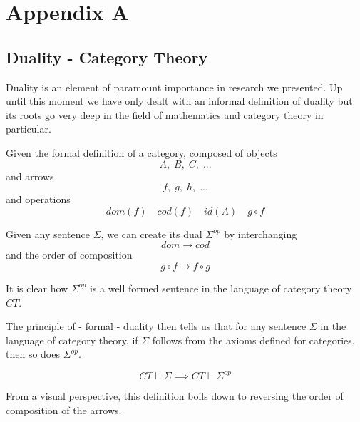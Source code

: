 \chapter{Appendix A}
\label{app:a}

\section{Duality - Category Theory}

Duality is an element of paramount importance in research we presented. Up until this moment we have only dealt with an informal definition of duality but its roots go very deep in the field of mathematics and category theory in particular.

Given the formal definition of a category, composed of objects $$A,\; B,\; C,\; ...$$ and arrows $$f,\; g,\; h,\; ... $$ and operations $$ dom(f) \quad cod(f) \quad id(A) \quad g \circ f $$ 

Given any sentence $ \Sigma $, we can create its dual $ \Sigma^{op} $ by interchanging $$dom \to cod$$ and the order of composition $$ g \circ f \to f \circ g $$ 

It is clear how $ \Sigma^{op} $ is a well formed sentence in the language of category theory $ CT $.

The principle of - formal - duality then tells us that for any sentence $ \Sigma $ in the language of category theory, if $ \Sigma $ follows from the axioms defined for categories, then so does $ \Sigma^{op}$. 

$$ CT \vdash \Sigma \implies CT \vdash \Sigma^{op} $$

From a visual perspective, this definition boils down to reversing the order of composition of the arrows. 

\begin{center}
\begin{minipage}{.3\textwidth}
\end{minipage}
\begin{minipage}{.3\textwidth}
\end{minipage}
\end{center}

